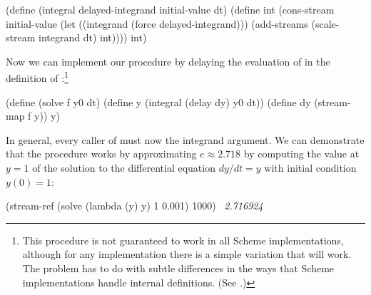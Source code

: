 \begin{codeBlock}
(define (integral delayed-integrand initial-value dt)
  (define int
    (cons-stream
     initial-value
     (let ((integrand (force delayed-integrand)))
       (add-streams (scale-stream integrand dt) int))))
  int)
\end{codeBlock}

\noindent
Now we can implement our  procedure by delaying the evaluation of
 in the definition of :\footnote{This procedure is not
guaranteed to work in all Scheme implementations, although for any
implementation there is a simple variation that will work.  The problem has to
do with subtle differences in the ways that Scheme implementations handle
internal definitions.  (See .)}

\begin{codeBlock}
(define (solve f y0 dt)
  (define y (integral (delay dy) y0 dt))
  (define dy (stream-map f y))
  y)
\end{codeBlock}

\noindent
In general, every caller of  must now  the integrand
argument.  We can demonstrate that the  procedure works by
approximating \( e \approx 2.718 \) by computing the value at \( y = 1 \) of the
solution to the differential equation \( dy / dt = y \) with initial
condition \( y(0) = 1 \):

\begin{codeBlock}
(stream-ref (solve (lambda (y) y)
                   1
                   0.001)
            1000)
~\textit{2.716924}~
\end{codeBlock}

